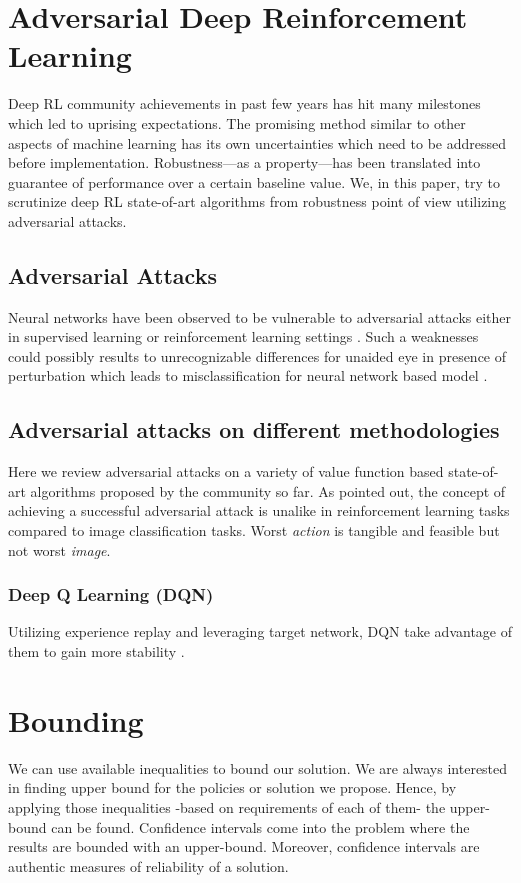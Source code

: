 \documentclass[a4paper,12pt]{article}
\begin{document}

\section{Adversarial Deep Reinforcement Learning}
Deep RL community achievements in past few years has hit many milestones which led to uprising expectations. The promising method similar to other aspects of machine learning has its own uncertainties which need to be addressed before implementation. Robustness---as a property---has been translated into guarantee of performance over a certain baseline value. We, in this paper, try to scrutinize deep RL state-of-art algorithms from robustness point of view utilizing adversarial attacks. 

\subsection{Adversarial Attacks}
Neural networks have been observed to be vulnerable to adversarial attacks either in supervised learning or reinforcement learning settings \cite{Huang2017}. Such a weaknesses could possibly results to unrecognizable differences for unaided eye in presence of perturbation which leads to misclassification for neural network based model \cite{Szegedy2014, Goodfellow2014}.

\subsection{Adversarial attacks on different methodologies}
Here we review adversarial attacks on a variety of value function based state-of-art algorithms proposed by the community so far. As \citet{Pattanaik2018} pointed out, the concept of achieving a successful adversarial attack is unalike in reinforcement learning tasks compared to image classification tasks. Worst \textit{action} is tangible and feasible but not worst \textit{image}.

\subsubsection{Deep Q Learning (DQN)}
Utilizing experience replay and leveraging target network, DQN take advantage of them to gain more stability \cite{Pattanaik2018}.


\section{Bounding}
We can use available inequalities to bound our solution. We are always interested in finding upper bound for the policies or solution we propose. Hence, by applying those inequalities -based on requirements of each of them- the upper-bound can be found. Confidence intervals come into the problem where the results are bounded with an upper-bound. Moreover, confidence intervals are authentic measures of reliability of a solution.
\end{document}
